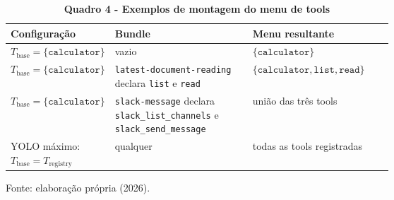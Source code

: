 \begin{table}[H]
\centering
\caption*{\textbf{Quadro 4 - Exemplos de montagem do menu de tools}}
\footnotesize
\renewcommand{\arraystretch}{1.12}
\begin{tabularx}{\linewidth}{|>{\raggedright\arraybackslash}p{0.27\linewidth}|>{\raggedright\arraybackslash}p{0.36\linewidth}|Y|}
\hline
\textbf{Configuração} & \textbf{Bundle} & \textbf{Menu resultante} \\
\hline
$T_{\mathrm{base}} = \{\texttt{calculator}\}$ &
vazio & $\{\texttt{calculator}\}$ \\
\hline
$T_{\mathrm{base}} = \{\texttt{calculator}\}$ &
\texttt{latest-document-reading} declara \texttt{list} e \texttt{read} &
$\{\texttt{calculator},\texttt{list},\texttt{read}\}$ \\
\hline
$T_{\mathrm{base}} = \{\texttt{calculator}\}$ &
\texttt{slack-message} declara \texttt{slack\_list\_channels} e
\texttt{slack\_send\_message} & união das três tools \\
\hline
YOLO máximo: $T_{\mathrm{base}} = T_{\mathrm{registry}}$ &
qualquer & todas as tools registradas \\
\hline
\end{tabularx}
\par\smallskip\raggedright\small Fonte: elaboração própria (2026).
\end{table}
